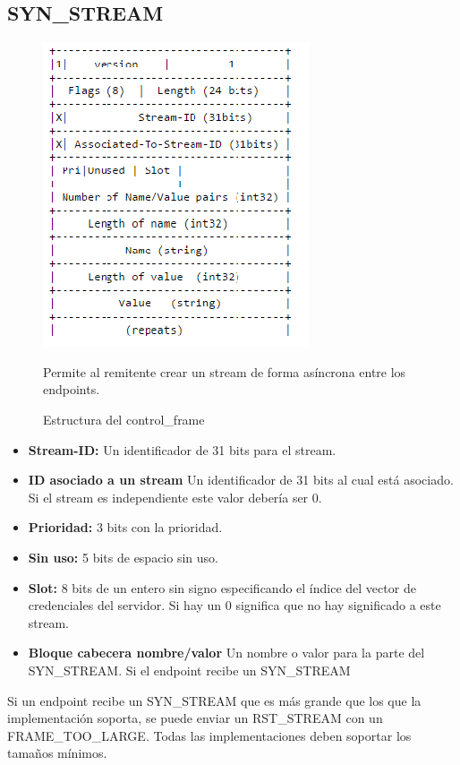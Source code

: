\subsection{SYN\_STREAM}
\begin{figure}[H] %
\includegraphics[scale=1]{synstream.png}  %
\centering
\caption{Estructura del control\_frame} \label{fig:figura3}
Permite al remitente crear un stream de forma asíncrona entre los endpoints.
\end{figure}
\begin{itemize}
\item \textbf{Stream-ID:} Un identificador de 31 bits para el stream.
\item \textbf{ID asociado a un stream} Un identificador de 31 bits al cual está asociado. Si el stream es  independiente este valor debería ser 0.
\item \textbf{Prioridad:} 3 bits con la prioridad.
\item \textbf{Sin uso:} 5 bits de espacio sin uso.
\item \textbf{Slot:} 8 bits de un entero sin signo especificando el índice del vector de credenciales del servidor. Si hay un 0 significa que no hay significado a este stream.
\item \textbf{Bloque cabecera nombre/valor} Un nombre o valor para la parte del SYN\_STREAM.
Si el endpoint recibe un SYN\_STREAM 
\end{itemize}
Si un endpoint recibe un SYN\_STREAM que es más grande que los que la implementación soporta, se puede enviar un RST\_STREAM con un FRAME\_TOO\_LARGE. Todas las implementaciones deben soportar los tamaños mínimos.

